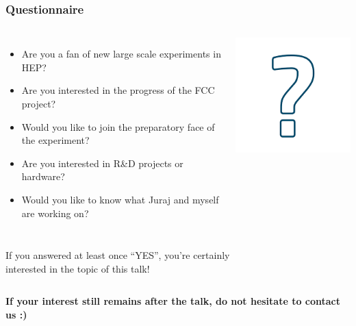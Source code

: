 \documentclass[aspectratio=169]{beamer}
\newcommand{\bluetext}[1]{%
  \textcolor{myBlue}{#1}
}
\begin{document}
%
%
\begin{frame}
  \frametitle{Questionnaire}

  \begin{columns}

    \begin{itemize}
      \item Are you a fan of new large scale experiments in HEP\@?
      \item Are you interested in the progress of the FCC project?
      \item Would you like to join the preparatory face of the experiment?
      \item Are you interested in R\&D projects or hardware?
      \item Would you like to know what Juraj and myself are working on?
    \end{itemize}


    \begin{center}
      \includegraphics[width=0.5\linewidth]{figures/question.png}
    \end{center}
  \end{columns}
  \pause%

  \vspace{1ex}
  \bluetext{If you answered at least once ``YES'', you're certainly\\ interested
            in the topic of this talk!}
  \pause%

  \vspace{-3ex}
  \begin{columns}

    \bluetext{\bf If your interest still remains after the talk, do not
              hesitate to contact us :)}


\end{columns}
\end{frame}
\end{document}

